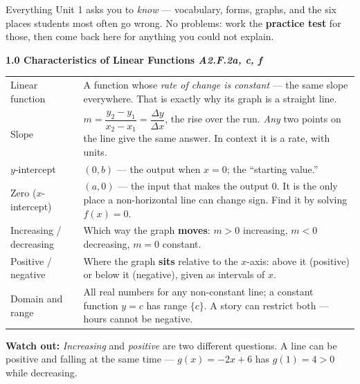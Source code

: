 \documentclass[10pt]{article}
\newcommand{\sghead}[2]{%
  \boxguard[10]%
  \vspace{4pt}\par\noindent
  \colorbox{forest}{\parbox{\dimexpr\linewidth-2\fboxsep}{%
    \small\color{white}\bfseries #1 \hfill \textmd{\itshape\scriptsize\color{forestmid} #2}}}%
  \vspace{2pt}\par}
\newcommand{\sgwatch}[1]{%
  \vspace{1pt}\par\noindent
  \colorbox{redbg}{\parbox{\dimexpr\linewidth-2\fboxsep}{%
    \footnotesize\textbf{\textcolor{redacc}{Watch out:}} #1}}%
  \vspace{1pt}\par}
\newcommand{\sgtabsetup}{\renewcommand{\arraystretch}{1.06}\footnotesize}
\begin{document}

\vspace{-0.30in}
\noindent\footnotesize Everything Unit 1 asks you to \emph{know} --- vocabulary, forms, graphs,
and the six places students most often go wrong. No problems: work the \textbf{practice test}
for those, then come back here for anything you could not explain.\par\normalsize

\sghead{1.0 \quad Characteristics of Linear Functions}{A2.F.2a, c, f}
{\sgtabsetup
\begin{tabularx}{\linewidth}{@{} G X @{}}
Linear function & A function whose \emph{rate of change is constant} --- the same slope
  everywhere. That is exactly why its graph is a straight line. \\
Slope & $m=\dfrac{y_2-y_1}{x_2-x_1}=\dfrac{\Delta y}{\Delta x}$, the rise over the run.
  \emph{Any} two points on the line give the same answer. In context it is a rate, with units. \\
$y$-intercept & $(0,b)$ --- the output when $x=0$; the ``starting value.'' \\
Zero ($x$-intercept) & $(a,0)$ --- the input that makes the output $0$. It is the only place a
  non-horizontal line can change sign. Find it by solving $f(x)=0$. \\
Increasing / decreasing & Which way the graph \textbf{moves}: $m>0$ increasing, $m<0$ decreasing,
  $m=0$ constant. \\
Positive / negative & Where the graph \textbf{sits} relative to the $x$-axis: above it (positive)
  or below it (negative), given as intervals of $x$. \\
Domain and range & All real numbers for any non-constant line; a constant function $y=c$ has
  range $\{c\}$. A story can restrict both --- hours cannot be negative. \\
\end{tabularx}}
\sgwatch{\emph{Increasing} and \emph{positive} are two different questions. A line can be
positive and falling at the same time --- $g(x)=-2x+6$ has $g(1)=4>0$ while decreasing.}
\end{document}
